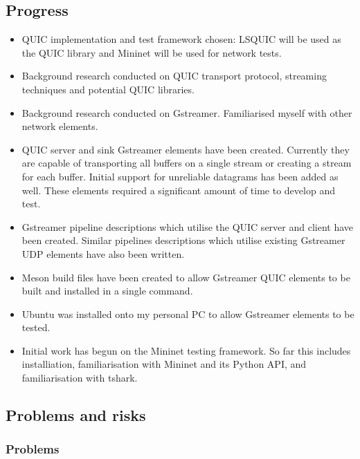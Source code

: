 \documentclass[11pt]{article}
\begin{document}
\subsection{Progress}\label{progress}

\begin{itemize}
\item QUIC implementation and test framework chosen: LSQUIC will be used as the QUIC library and Mininet will be used for network tests.
\item Background research conducted on QUIC transport protocol, streaming techniques and potential QUIC libraries.
\item Background research conducted on Gstreamer. Familiarised myself with other network elements.
\item QUIC server and sink Gstreamer elements have been created. Currently they are capable of transporting
all buffers on a single stream or creating a stream for each buffer. Initial support for unreliable datagrams has been added as well. These elements required a significant amount of time to develop and test.
\item Gstreamer pipeline descriptions which utilise the QUIC server and client have been created. Similar pipelines descriptions which utilise existing Gstreamer UDP elements have also been written.
\item Meson build files have been created to allow Gstreamer QUIC elements to be built and installed in a single command.
\item Ubuntu was installed onto my personal PC to allow Gstreamer elements to be tested.
\item Initial work has begun on the Mininet testing framework. So far this includes installiation, familiarisation with Mininet and its Python API, and familiarisation with tshark.
\end{itemize}

\subsection{Problems and risks}\label{problems-and-risks}

\subsubsection{Problems}\label{problems}
\end{document}
